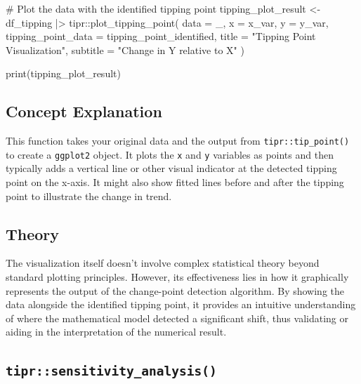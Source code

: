 \documentclass[
  10pt,
  letterpaper,
  DIV=11,
  numbers=noendperiod]{scrartcl}
\newenvironment{Shaded}{\begin{snugshade}}{\end{snugshade}}
\newcommand{\AttributeTok}[1]{\textcolor[rgb]{0.40,0.45,0.13}{#1}}
\newcommand{\CommentTok}[1]{\textcolor[rgb]{0.37,0.37,0.37}{#1}}
\newcommand{\FunctionTok}[1]{\textcolor[rgb]{0.28,0.35,0.67}{#1}}
\newcommand{\NormalTok}[1]{\textcolor[rgb]{0.00,0.23,0.31}{#1}}
\newcommand{\OtherTok}[1]{\textcolor[rgb]{0.00,0.23,0.31}{#1}}
\newcommand{\SpecialCharTok}[1]{\textcolor[rgb]{0.37,0.37,0.37}{#1}}
\newcommand{\StringTok}[1]{\textcolor[rgb]{0.13,0.47,0.30}{#1}}
\begin{document}
\begin{Shaded}
\begin{Highlighting}[]
\CommentTok{\# Plot the data with the identified tipping point}
\NormalTok{tipping\_plot\_result }\OtherTok{\textless{}{-}}\NormalTok{ df\_tipping }\SpecialCharTok{|\textgreater{}}
\NormalTok{  tipr}\SpecialCharTok{::}\FunctionTok{plot\_tipping\_point}\NormalTok{(}
    \AttributeTok{data =}\NormalTok{ \_,}
    \AttributeTok{x =}\NormalTok{ x\_var,}
    \AttributeTok{y =}\NormalTok{ y\_var,}
    \AttributeTok{tipping\_point\_data =}\NormalTok{ tipping\_point\_identified,}
    \AttributeTok{title =} \StringTok{"Tipping Point Visualization"}\NormalTok{,}
    \AttributeTok{subtitle =} \StringTok{"Change in Y relative to X"}
\NormalTok{  )}

\FunctionTok{print}\NormalTok{(tipping\_plot\_result)}
\end{Highlighting}
\end{Shaded}

\subsection{Concept Explanation}\label{concept-explanation-1}

This function takes your original data and the output from
\texttt{tipr::tip\_point()} to create a \texttt{ggplot2} object. It
plots the \texttt{x} and \texttt{y} variables as points and then
typically adds a vertical line or other visual indicator at the detected
tipping point on the x-axis. It might also show fitted lines before and
after the tipping point to illustrate the change in trend.

\subsection{Theory}\label{theory-1}

The visualization itself doesn't involve complex statistical theory
beyond standard plotting principles. However, its effectiveness lies in
how it graphically represents the output of the change-point detection
algorithm. By showing the data alongside the identified tipping point,
it provides an intuitive understanding of where the mathematical model
detected a significant shift, thus validating or aiding in the
interpretation of the numerical result.

\subsection{\texorpdfstring{\texttt{tipr::sensitivity\_analysis()}}{tipr::sensitivity\_analysis()}}\label{tiprsensitivity_analysis}
\end{document}
